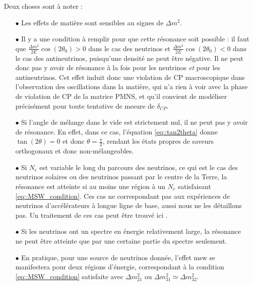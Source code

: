             Deux choses sont à noter : 
            \begin{itemize}
            	\item[$\bullet$] Les effets de matière sont sensibles au signes de $\Delta m^2$.
                \item[$\bullet$] Il y a une condition à remplir pour que cette résonance soit possible : il faut que $\frac{\Delta m^2}{2E}\cos(2\theta_0) > 0$ dans le cas des neutrinos et $\frac{\Delta m^2}{2E}\cos(2\theta_0) < 0$ dans le cas des antineutrinos, puisqu'une densité ne peut être négative. Il ne peut donc pas y avoir de résonance à la fois pour les neutrinos \textit{et} pour les antineutrinos. Cet effet induit donc une violation de CP macroscopique dans l'observation des oscillations dans la matière, qui n'a rien à voir avec la phase de violation de CP de la matrice PMNS, et qu'il convient de modéliser précisément pour toute tentative de mesure de $\delta_{CP}$.
                \item[$\bullet$] Si l'angle de mélange dans le vide est strictement nul, il ne peut pas y avoir de résonance. En effet, dans ce cas, l'équation \eqref{eq::tan2theta} donne $\tan(2\theta)=0$ et donc $\theta=\frac{\pi}{2}$, rendant les états propres de saveurs orthogonaux et donc non-mélangeables.
                \item[$\bullet$] Si $N_e$ est variable le long du parcours des neutrinos, ce qui est le cas des neutrinos solaires ou des neutrinos passant par le centre de la Terre, la résonance est atteinte si au moins une région à un $N_e$ satisfaisant \eqref{eq::MSW_condition}. Ces cas ne correspondant pas aux expériences de neutrinos d'accélérateurs à longue ligne de base, aussi nous ne les détaillons pas. Un traitement de ces cas peut être trouvé ici \cite{Akhmedov2000}.
                \item[$\bullet$] Si les neutrinos ont un spectre en énergie relativement large, la résonance ne peut être atteinte que par une certaine partie du spectre seulement.
                \item[$\bullet$] En pratique, pour une source de neutrinos donnée, l'effet \gls{msw} se manifestera pour deux régions d'énergie, correspondant à la condition \eqref{eq::MSW_condition} satisfaite avec $\Delta m^2_{21}$ ou $\Delta m^2_{31}\simeq\Delta m^2_{32}$.
            \end{itemize}
                
            
